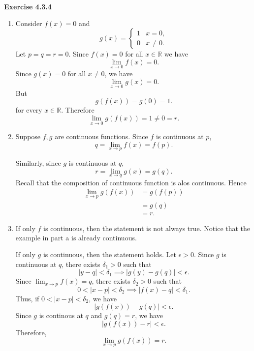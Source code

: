 \documentclass[12pt]{article}
\begin{document}
\textbf{Exercise 4.3.4}
\begin{enumerate}[label=(\alph*)]
    \item Consider \( f(x) = 0 \) and
          \[
              g(x)=
              \begin{cases}
                  1 & x=0,    \\
                  0 & x\neq0.
              \end{cases}
          \]
          Let \( p = q = r = 0 \). Since \( f(x) = 0 \) for all \( x \in \mathbb{R} \) we have
          \[
              \lim_{x \to 0} f(x) = 0.
          \]
          Since \( g(x) = 0 \) for all \( x \neq 0 \), we have
          \[
              \lim_{x \to 0} g(x) = 0.
          \]
          But
          \[
              g(f(x)) = g(0) = 1.
          \]
          for every \(  x \in \mathbb{R} \). Therefore
          \[
              \lim_{x \to 0} g(f(x)) = 1 \neq 0 = r.
          \]
    \item Suppose \( f,g \) are continuous functions. Since \(f\) is continuous at \(p\),
          \[
              q=\lim_{x\to p}f(x)=f(p).
          \]

          Similarly, since \(g\) is continuous at \(q\),
          \[
              r=\lim_{x\to q}g(x)=g(q).
          \] Recall that the composition of continuous function is alos continuous. Hence
          \[
              \begin{aligned}
                  \lim_{x\to p}g(f(x))
                   & =g(f(p)) \\
                   & =g(q)    \\
                   & =r.
              \end{aligned}
          \]
    \item If only \( f \) is continuous, then the statement is not always true. Notice that the example in part a is already continuous.

          If only \( g \) is continuous, then the statement holds. Let \( \epsilon > 0 \). Since \( g  \) is continuous at \( q \), there exists \( \delta_1 > 0 \) such that
          \[
              \vert y - q \vert < \delta_1 \implies \vert g(y) - g(q) \vert < \epsilon.
          \]
          Since \(\lim_{x\to p}f(x)=q\), there exists \(\delta_2>0\) such that
          \[
              0<|x-p|<\delta_2
              \implies |f(x)-q|< \delta_1.
          \]
          Thus, if \( 0 < \vert x - p \vert < \delta_2 \), we have
          \[
              \vert g(f(x)) - g(q) \vert  < \epsilon.
          \]
          Since \( g \) is continous at \( q \) and \( g(q) = r \), we have
          \[
              \vert g(f(x)) - r \vert  < \epsilon.
          \]
          Therefore,
          \[
              \lim_{x \to p} g(f(x)) = r.
          \]

\end{enumerate}
\end{document}
